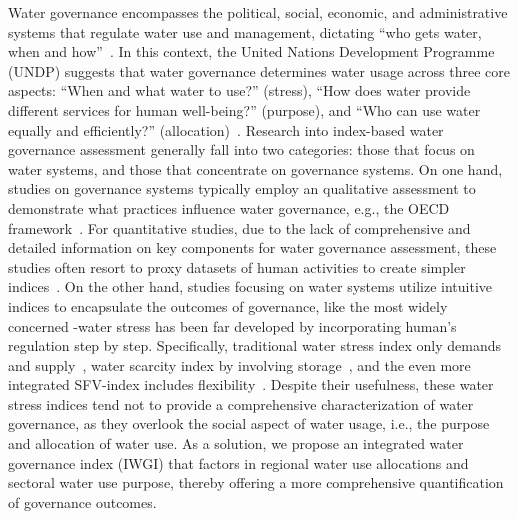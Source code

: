 \documentclass[draft]{../agujournal2019}
\begin{document}
Water governance encompasses the political, social, economic, and administrative systems that regulate water use and management, dictating ``who gets water, when and how''~\cite{lasswell2018,allan2001}.
In this context, the United Nations Development Programme (UNDP) suggests that water governance determines water usage across three core aspects: ``When and what water to use?'' (stress), ``How does water provide different services for human well-being?'' (purpose), and ``Who can use water equally and efficiently?'' (allocation)~\cite{mariajacobson2013}.
Research into index-based water governance assessment generally fall into two categories: those that focus on water systems, and those that concentrate on governance systems.
On one hand, studies on governance systems typically employ an qualitative assessment to demonstrate what practices influence water governance, e.g., the OECD framework~\cite{oecd2018a}.
For quantitative studies, due to the lack of comprehensive and detailed information on key components for water governance assessment, these studies often resort to proxy datasets of human activities to create simpler indices~\cite{varis2019,huggins2022a}.
On the other hand, studies focusing on water systems utilize intuitive indices to encapsulate the outcomes of governance, like the most widely concerned -water stress has been far developed by incorporating human's regulation step by step.
Specifically, traditional water stress index only demands and supply~\cite{gleick1996}, water scarcity index by involving storage~\cite{damkjaer2017}, and the even more integrated SFV-index includes flexibility~\cite{qin2019}.
Despite their usefulness, these water stress indices tend not to provide a comprehensive characterization of water governance, as they overlook the social aspect of water usage, i.e., the purpose and allocation of water use.
As a solution, we propose an integrated water governance index (IWGI) that factors in regional water use allocations and sectoral water use purpose, thereby offering a more comprehensive quantification of governance outcomes.
\end{document}
